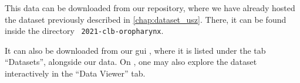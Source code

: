 \begin{tcolorbox}[
    title=\faIcon{database} Data,
    parbox=false,
    float
]
    This data can be downloaded from our  repository, where we have already hosted the dataset previously described in \cref{chap:dataset_usz}. There, it can be found inside the directory ~\texttt{2021-clb-oropharynx}.

    It can also be downloaded from our \gls{gui} \inlinelyproxlogo{}, where it is listed under the tab ``Datasets'', alongside our data. On \inlinelyproxlogo{}, one may also explore the dataset interactively in the ``Data Viewer'' tab.
\end{tcolorbox}
